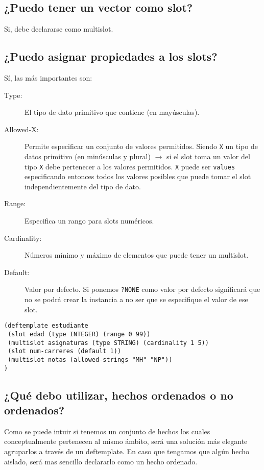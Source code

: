 \documentclass[11pt,svgnames]{scrbook}
\begin{document}
\subsection{¿Puedo tener un vector como slot?}

Si, debe declararse como multislot.

\subsection{¿Puedo asignar propiedades a los slots?}

Sí, las más importantes son:
\begin{description}
 \item[Type:]
 El tipo de dato primitivo que contiene (en mayúsculas).
\item [Allowed-X:] Permite especificar un conjunto de valores permitidos. Siendo \texttt{X} un tipo
de datos primitivo (en minúsculas y plural) $\rightarrow$ si el slot toma un valor del tipo
\texttt{X} debe pertenecer a los valores permitidos. \texttt{X} puede ser \texttt{values}
especificando entonces todos los valores posibles que puede tomar el slot independientemente del
tipo de dato.
\item [Range:] Especifica un rango para slots numéricos.
\item [Cardinality:] Números mínimo y máximo de elementos que puede tener un multislot.
\item [Default:] Valor por defecto. Si ponemos \texttt{?NONE} como valor por defecto significará que
no se podrá crear la instancia a no ser que se especifique el valor de ese slot.
 \end{description}

\begin{verbatim}
(deftemplate estudiante
 (slot edad (type INTEGER) (range 0 99))
 (multislot asignaturas (type STRING) (cardinality 1 5))
 (slot num-carreres (default 1))
 (multislot notas (allowed-strings "MH" "NP"))
)
\end{verbatim}

\subsection{¿Qué debo utilizar, hechos ordenados o no ordenados?}

Como se puede intuir si tenemos un conjunto de hechos los cuales conceptualmente pertenecen al mismo ámbito, será una solución más elegante agruparlos a través de un deftemplate. En caso que tengamos que algún hecho aislado, será mas sencillo declararlo como un hecho ordenado.
\end{document}
